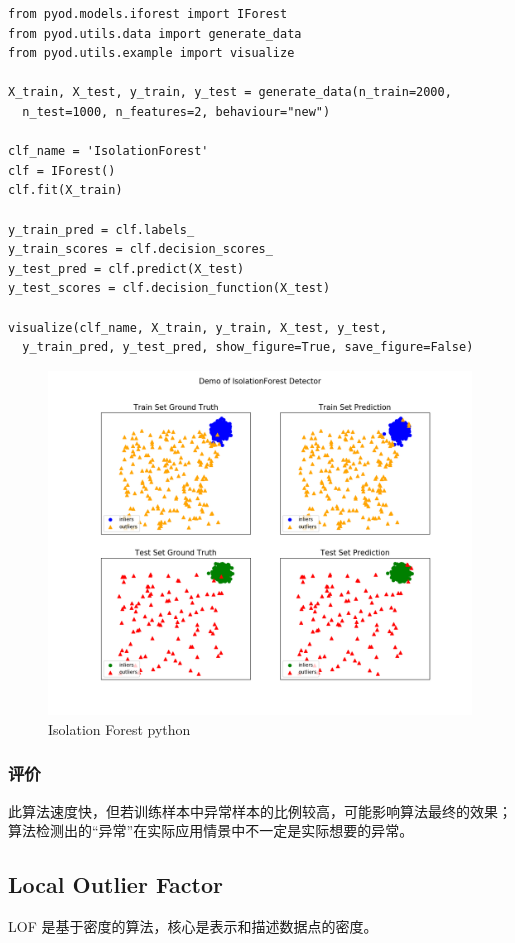 \documentclass[UTF8]{ctexart}
\begin{document}
\begin{lstlisting}[style=stylePy]
from pyod.models.iforest import IForest  
from pyod.utils.data import generate_data
from pyod.utils.example import visualize

X_train, X_test, y_train, y_test = generate_data(n_train=2000,
  n_test=1000, n_features=2, behaviour="new")

clf_name = 'IsolationForest'
clf = IForest()
clf.fit(X_train)

y_train_pred = clf.labels_ 
y_train_scores = clf.decision_scores_
y_test_pred = clf.predict(X_test) 
y_test_scores = clf.decision_function(X_test) 

visualize(clf_name, X_train, y_train, X_test, y_test,
  y_train_pred, y_test_pred, show_figure=True, save_figure=False)
\end{lstlisting}
\begin{figure}[ht]
\centering
\includegraphics[scale=0.5]{IForest_py1.png}
\caption{Isolation Forest python}
\end{figure}

        \subsubsection{评价}
            此算法速度快，但若训练样本中异常样本的比例较高，可能影响算法最终的效果；算法检测出的“异常”在实际应用情景中不一定是实际想要的异常。

    \subsection{Local Outlier Factor}
        LOF 是基于密度的算法，核心是表示和描述数据点的密度。
\end{document}
